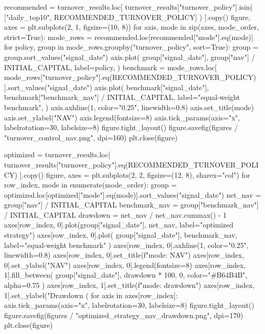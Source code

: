 \documentclass[UTF8,a4paper,fontset=fandol]{ctexart}
\begin{document}
\begin{ProjectCode}
    recommended = turnover_results.loc[
        turnover_results["turnover_policy"].isin(
            ["daily_top10", RECOMMENDED_TURNOVER_POLICY]
        )
    ].copy()
    figure, axes = plt.subplots(2, 1, figsize=(10, 8))
    for axis, mode in zip(axes, mode_order, strict=True):
        mode_rows = recommended.loc[recommended["mode"].eq(mode)]
        for policy, group in mode_rows.groupby("turnover_policy", sort=True):
            group = group.sort_values("signal_date")
            axis.plot(
                group["signal_date"],
                group["nav"] / INITIAL_CAPITAL,
                label=policy,
            )
        benchmark = mode_rows.loc[
            mode_rows["turnover_policy"].eq(RECOMMENDED_TURNOVER_POLICY)
        ].sort_values("signal_date")
        axis.plot(
            benchmark["signal_date"],
            benchmark["benchmark_nav"] / INITIAL_CAPITAL,
            label="equal-weight benchmark",
        )
        axis.axhline(1, color="0.25", linewidth=0.8)
        axis.set_title(mode)
        axis.set_ylabel("NAV")
        axis.legend(fontsize=8)
        axis.tick_params(axis="x", labelrotation=30, labelsize=8)
    figure.tight_layout()
    figure.savefig(figures / "turnover_control_nav.png", dpi=160)
    plt.close(figure)

    optimized = turnover_results.loc[
        turnover_results["turnover_policy"].eq(RECOMMENDED_TURNOVER_POLICY)
    ].copy()
    figure, axes = plt.subplots(2, 2, figsize=(12, 8), sharex="col")
    for row_index, mode in enumerate(mode_order):
        group = optimized.loc[optimized["mode"].eq(mode)].sort_values("signal_date")
        net_nav = group["nav"] / INITIAL_CAPITAL
        benchmark_nav = group["benchmark_nav"] / INITIAL_CAPITAL
        drawdown = net_nav / net_nav.cummax() - 1
        axes[row_index, 0].plot(group["signal_date"], net_nav, label="optimized strategy")
        axes[row_index, 0].plot(
            group["signal_date"], benchmark_nav, label="equal-weight benchmark"
        )
        axes[row_index, 0].axhline(1, color="0.25", linewidth=0.8)
        axes[row_index, 0].set_title(f"{mode}: NAV")
        axes[row_index, 0].set_ylabel("NAV")
        axes[row_index, 0].legend(fontsize=8)
        axes[row_index, 1].fill_between(
            group["signal_date"], drawdown * 100, 0, color="#B64B4B", alpha=0.75
        )
        axes[row_index, 1].set_title(f"{mode}: drawdown")
        axes[row_index, 1].set_ylabel("Drawdown (%
        for axis in axes[row_index]:
            axis.tick_params(axis="x", labelrotation=30, labelsize=8)
    figure.tight_layout()
    figure.savefig(figures / "optimized_strategy_nav_drawdown.png", dpi=170)
    plt.close(figure)


\end{ProjectCode}
\end{document}
